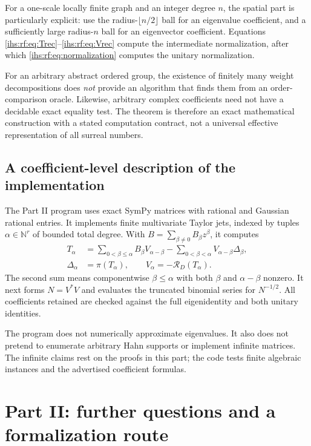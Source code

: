 \documentclass[11pt,a4paper]{article}
\numberwithin{equation}{section}
\theoremstyle{definition}
\theoremstyle{remark}
\newcommand{\N}{\mathbb N}
\begin{document}
For a one-scale locally finite graph and an integer degree $n$, the spatial
part is particularly explicit: use the radius-$\lfloor n/2\rfloor$ ball for
an eigenvalue coefficient, and a sufficiently large radius-$n$ ball for an
eigenvector coefficient. Equations
\eqref{ihs:rf:eq:Trec}--\eqref{ihs:rf:eq:Vrec} compute the intermediate
normalization, after which \eqref{ihs:rf:eq:normalization} computes the
unitary normalization.

For an arbitrary abstract ordered group, the existence of finitely many
weight decompositions does \emph{not} provide an algorithm that finds them
from an order-comparison oracle. Likewise, arbitrary complex coefficients
need not have a decidable exact equality test. The theorem is therefore an
exact mathematical construction with a stated computation contract, not a
universal effective representation of all surreal numbers.

\subsection{A coefficient-level description of the implementation}\label{ihs:rf:sec:impl}
The Part II program uses exact SymPy matrices with rational and Gaussian
rational entries. It implements finite multivariate Taylor jets, indexed by
tuples $\alpha\in\N^r$ of bounded total degree. With
$B=\sum_{\beta\ne0}B_\beta z^\beta$, it computes
\begin{align*}
 T_\alpha&=\sum_{0<\beta\le\alpha}B_\beta V_{\alpha-\beta}
 -\sum_{0<\beta<\alpha}V_{\alpha-\beta}\Delta_\beta,\\
 \Delta_\alpha&=\pi(T_\alpha),\qquad V_\alpha=-\mathcal R_D(T_\alpha).
\end{align*}
The second sum means componentwise $\beta\le\alpha$ with both $\beta$ and
$\alpha-\beta$ nonzero. It next forms $N=V^*V$ and evaluates the truncated
binomial series for $N^{-1/2}$. All coefficients retained are checked
against the full eigenidentity and both unitary identities.

The program does not numerically approximate eigenvalues. It also does not
pretend to enumerate arbitrary Hahn supports or implement infinite matrices.
The infinite claims rest on the proofs in this part; the code tests finite
algebraic instances and the advertised coefficient formulas.

\section{Part II: further questions and a formalization route}\label{ihs:rf:sec:further}
\end{document}
